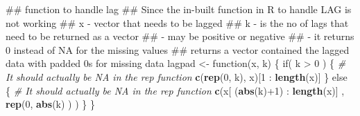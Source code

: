 \documentclass[]{article}
\newenvironment{Shaded}{\begin{snugshade}}{\end{snugshade}}
\newcommand{\KeywordTok}[1]{\textcolor[rgb]{0.13,0.29,0.53}{\textbf{{#1}}}}
\newcommand{\DecValTok}[1]{\textcolor[rgb]{0.00,0.00,0.81}{{#1}}}
\newcommand{\StringTok}[1]{\textcolor[rgb]{0.31,0.60,0.02}{{#1}}}
\newcommand{\CommentTok}[1]{\textcolor[rgb]{0.56,0.35,0.01}{\textit{{#1}}}}
\newcommand{\NormalTok}[1]{{#1}}
\begin{document}
\begin{Shaded}
\begin{Highlighting}[]
\NormalTok{## function to handle lag}
\NormalTok{## Since the in-built function in R to handle LAG is not working}
\NormalTok{## x - vector that needs to be lagged}
\NormalTok{## k - is the no of lags that need to be returned as a vector }
\NormalTok{##   - may be positive or negative}
\NormalTok{##   - it returns 0 instead of NA for the missing values}
\NormalTok{## returns a vector contained the lagged data with padded 0s for missing data}
\NormalTok{lagpad <-}\StringTok{ }\NormalTok{function(x, k) \{}
  \NormalTok{if( k >}\StringTok{ }\DecValTok{0} \NormalTok{) \{}
    \CommentTok{# It should actually be NA in the rep function}
    \KeywordTok{c}\NormalTok{(}\KeywordTok{rep}\NormalTok{(}\DecValTok{0}\NormalTok{, k), x)[}\DecValTok{1} \NormalTok{:}\StringTok{ }\KeywordTok{length}\NormalTok{(x)] }
  \NormalTok{\} else \{}
    \CommentTok{# It should actually be NA in the rep function}
    \KeywordTok{c}\NormalTok{(x[ (}\KeywordTok{abs}\NormalTok{(k)+}\DecValTok{1}\NormalTok{) :}\StringTok{ }\KeywordTok{length}\NormalTok{(x)] , }\KeywordTok{rep}\NormalTok{(}\DecValTok{0}\NormalTok{, }\KeywordTok{abs}\NormalTok{(k) ) )  }
  \NormalTok{\}}
\NormalTok{\}}
\end{Highlighting}
\end{Shaded}
\end{document}
